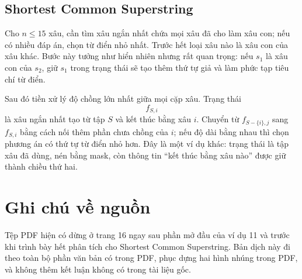 \documentclass[11pt]{article}
\begin{document}
\subsection{Shortest Common Superstring}

Cho \(n\le15\) xâu, cần tìm xâu ngắn nhất chứa mọi xâu đã cho làm xâu con;
nếu có nhiều đáp án, chọn từ điển nhỏ nhất. Trước hết loại xâu nào là xâu con
của xâu khác. Bước này tưởng như hiển nhiên nhưng rất quan trọng: nếu \(s_1\)
là xâu con của \(s_2\), giữ \(s_1\) trong trạng thái sẽ tạo thêm thứ tự giả
và làm phức tạp tiêu chí từ điển.

Sau đó tiền xử lý độ chồng lớn nhất giữa mọi cặp xâu. Trạng thái
\[
  f_{S,i}
\]
là xâu ngắn nhất tạo từ tập \(S\) và kết thúc bằng xâu \(i\). Chuyển từ
\(f_{S-\{i\},j}\) sang \(f_{S,i}\) bằng cách nối thêm phần chưa chồng của
\(i\); nếu độ dài bằng nhau thì chọn phương án có thứ tự từ điển nhỏ hơn. Đây
là một ví dụ khác: trạng thái là tập xâu đã dùng, nén bằng mask, còn thông tin
``kết thúc bằng xâu nào'' được giữ thành chiều thứ hai.

\section{Ghi chú về nguồn}

Tệp PDF hiện có dừng ở trang 16 ngay sau phần mở đầu của ví dụ 11 và trước khi
trình bày hết phân tích cho Shortest Common Superstring. Bản dịch này đi theo
toàn bộ phần văn bản có trong PDF, phục dựng hai hình nhúng trong PDF,
và không thêm kết luận không có trong tài liệu gốc.
\end{document}
